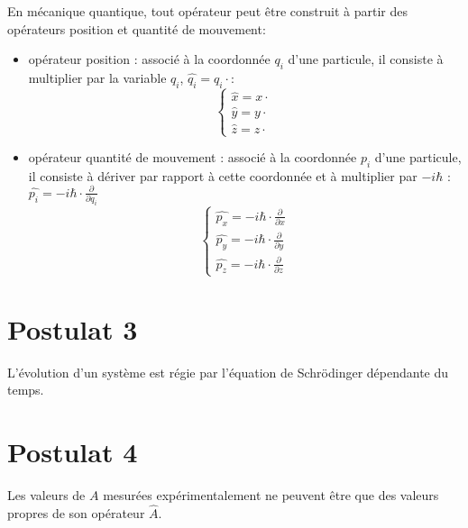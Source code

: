 \documentclass[../main.tex]{subfile}
\begin{document}
	En mécanique quantique, tout opérateur peut être construit à partir des opérateurs position et quantité de mouvement:
\begin{itemize}
	\item opérateur position : associé à la coordonnée $q_i$ d'une particule, il consiste à multiplier par la variable $q_i$, $\hat{q_i} = q_i \cdot$:
	$$
	\left\{
\begin{array}{l}
	\hat{x} = x \cdot \\
	\hat{y} = y \cdot \\
	\hat{z} = z \cdot 
\end{array}
	\right .
	$$
	\item opérateur quantité de mouvement : associé à la coordonnée $p_i$ d'une particule, il consiste à dériver par rapport à cette coordonnée et à multiplier par $-i\hbar$ : $\hat{p_i} = -i\hbar \cdot \frac{\partial}{\partial q_i}$
	$$
	\left\{
\begin{array}{l}
	\hat{p_x} = -i\hbar \cdot \frac{\partial}{\partial x}\\
	\hat{p_y} = -i\hbar \cdot \frac{\partial}{\partial y}\\
	\hat{p_z} = -i\hbar \cdot \frac{\partial}{\partial z}
\end{array}
	\right.
	$$
\end{itemize}


\section{Postulat 3}
L'évolution d'un système est régie par l'équation de Schrödinger dépendante du temps.


\section{Postulat 4}
Les valeurs de $A$ mesurées expérimentalement ne peuvent être que des valeurs propres de son opérateur $\hat{A}$.
\end{document}
